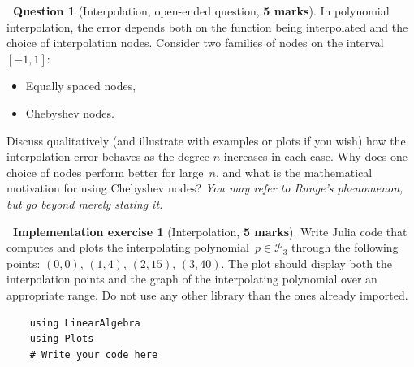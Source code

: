 \documentclass[10pt]{article}
\theoremstyle{definition}
\newtheorem{question}{{\normalfont \faGears}~Question}
\newtheorem{compexercise}{{\normalfont \faLaptop}~Implementation exercise}
\renewcommand{\mymarks}[1]{\textbf{#1 marks}}
\begin{document}
\newpage
\begin{question}
    [Interpolation, open-ended question, \mymarks{5}]
    In polynomial interpolation, the error depends both on the function being interpolated and the choice of interpolation nodes. Consider two families of nodes on the interval $[-1,1]$:
    \begin{itemize}
        \item Equally spaced nodes,
        \item Chebyshev nodes.
    \end{itemize}
    Discuss qualitatively (and illustrate with examples or plots if you wish) how the interpolation error behaves as the degree 
    $n$ increases in each case. 
    Why does one choice of nodes perform better for large~$n$,
    and what is the mathematical motivation for using Chebyshev nodes?
    \emph{You may refer to Runge’s phenomenon, but go beyond merely stating it.}
\end{question}

\newpage
\begin{compexercise}
    [Interpolation, \mymarks{5}]
    Write Julia code that computes and plots the interpolating polynomial~$p \in \mathcal P_3$ through the following points:
    $(0, 0)$, $(1, 4)$, $(2, 15)$, $(3, 40)$.
    The plot should display both the interpolation points and the graph of the interpolating polynomial over an appropriate range.
    Do not use any other library than the ones already imported.

        \begin{verbatim}
    using LinearAlgebra
    using Plots
    # Write your code here
        \end{verbatim}

    \vspace{9cm}
\end{compexercise}
\end{document}

